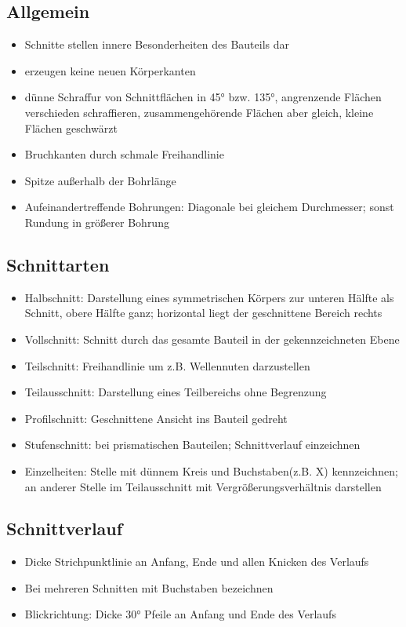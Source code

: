 \documentclass[a4paper,DIV=15,fontsize=11pt]{scrartcl}
\begin{document}
\subsection{Allgemein}
\begin{itemize}
	\item Schnitte stellen innere Besonderheiten des Bauteils dar
	\item erzeugen keine neuen Körperkanten
	\item dünne Schraffur von Schnittflächen in 45° bzw. 135°, angrenzende Flächen verschieden schraffieren, zusammengehörende Flächen aber gleich, kleine Flächen geschwärzt
	\item Bruchkanten durch schmale Freihandlinie
	\item Spitze außerhalb der Bohrlänge
	\item Aufeinandertreffende Bohrungen: Diagonale bei gleichem Durchmesser; sonst Rundung in größerer Bohrung
\end{itemize}
		
\subsection{Schnittarten}
\begin{itemize}
	\item Halbschnitt: Darstellung eines symmetrischen Körpers zur unteren Hälfte als Schnitt, obere Hälfte ganz; horizontal liegt der geschnittene Bereich rechts
	\item Vollschnitt: Schnitt durch das gesamte Bauteil in der gekennzeichneten Ebene
	\item Teilschnitt: Freihandlinie um z.B. Wellennuten darzustellen
	\item Teilausschnitt: Darstellung eines Teilbereichs ohne Begrenzung
	\item Profilschnitt: Geschnittene Ansicht ins Bauteil gedreht
	\item Stufenschnitt: bei prismatischen Bauteilen; Schnittverlauf einzeichnen
	\item Einzelheiten: Stelle mit dünnem Kreis und Buchstaben(z.B. X) kennzeichnen; an anderer Stelle im Teilausschnitt mit Vergrößerungsverhältnis darstellen
\end{itemize}

\subsection{Schnittverlauf}
\begin{itemize}
	\item Dicke Strichpunktlinie an Anfang, Ende und allen Knicken des Verlaufs
	\item Bei mehreren Schnitten mit Buchstaben bezeichnen
	\item Blickrichtung: Dicke 30° Pfeile an Anfang und Ende des Verlaufs
\end{itemize}
		
\end{document}
